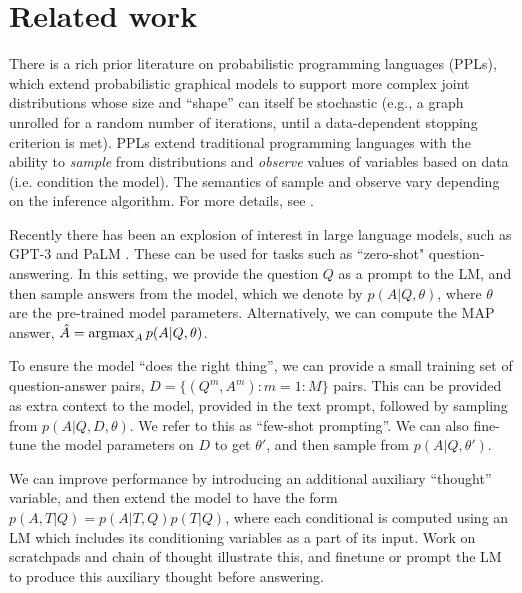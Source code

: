 \section{Related work}

There is a rich prior literature on 
probabilistic programming languages (PPLs),
which extend probabilistic graphical models to
support more complex joint distributions whose size and ``shape''
can itself be stochastic (e.g., a graph
unrolled for a random number of iterations,
until a data-dependent stopping criterion is met).
PPLs extend traditional programming languages with the ability to {\it sample} from distributions and {\it observe} values of variables based on data (i.e. condition the model).
The semantics of sample and observe vary depending on the inference algorithm.
For more details, see  \citet{intro_ppl}.

Recently there has been an explosion of interest in large language models, such as 
GPT-3 \citep{gpt3} and PaLM \citep{palm}.
These can be used for tasks such as ``zero-shot"
question-answering. In this setting, we 
provide the question $Q$ as a prompt to the LM,
and then sample answers from the model, 
which we denote by $p(A|Q,\theta)$,
where $\theta$ are the pre-trained model parameters.
Alternatively, we can compute the MAP answer,
$\hat{A} = \operatorname*{\arg\!\max}_A p(A|Q,\theta)$.


To ensure the model ``does the right thing'',
we can provide a small training set of question-answer pairs,
$D = \{ (Q^m,A^m): m=1:M\}$ pairs.
This can be provided as extra context to the model,
provided in the text prompt, followed by sampling
from $p(A|Q,D,\theta)$.
We refer to this as ``few-shot prompting''.
We can also fine-tune the model parameters on $D$ to
get $\theta'$, and then sample
from $p(A|Q,\theta')$.


We can improve performance by introducing an additional auxiliary ``thought'' variable,
and then extend the model to have the form $p(A,T|Q) = p(A|T,Q)p(T|Q)$, where each conditional is computed using an LM which includes its conditioning variables as a part of its input.
Work on scratchpads \citep{scratchpads} and chain of thought \citep{chainofthought} illustrate this, and finetune or prompt the LM to produce this auxiliary thought before answering.


